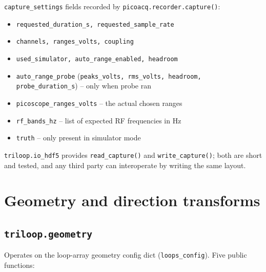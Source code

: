 \documentclass[11pt]{article}
\begin{document}
\noindent\texttt{capture\_settings} fields recorded by
\texttt{picoacq.recorder.capture()}:
\begin{itemize}\itemsep=2pt
\item \texttt{requested\_duration\_s, requested\_sample\_rate}
\item \texttt{channels, ranges\_volts, coupling}
\item \texttt{used\_simulator, auto\_range\_enabled, headroom}
\item \texttt{auto\_range\_probe} (\texttt{peaks\_volts, rms\_volts,
      headroom, probe\_duration\_s}) -- only when probe ran
\item \texttt{picoscope\_ranges\_volts} -- the actual chosen ranges
\item \texttt{rf\_bands\_hz} -- list of expected RF frequencies in Hz
\item \texttt{truth} -- only present in simulator mode
\end{itemize}

\texttt{triloop.io\_hdf5} provides \texttt{read\_capture()} and
\texttt{write\_capture()}; both are short and tested, and any third
party can interoperate by writing the same layout.

\section{Geometry and direction transforms}

\subsection{\texttt{triloop.geometry}}

Operates on the loop-array geometry config dict
(\texttt{loops\_config}).  Five public functions:
\end{document}
